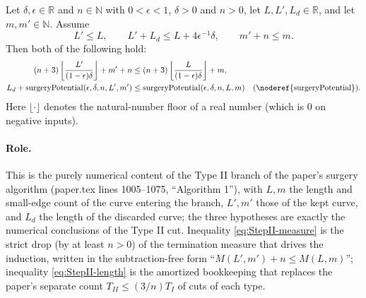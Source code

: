\begin{helper}
  Let $\delta,\epsilon \in \mathbb{R}$ and $n \in \mathbb{N}$ with $0<\epsilon<1$, $\delta>0$ and
  $n>0$, let $L,L',L_d \in \mathbb{R}$, and let $m,m' \in \mathbb{N}$. Assume
  \[
    L' \le L
    , \qquad
    L' + L_d \le L + 4\epsilon^{-1}\delta
    , \qquad
    m' + n \le m
    .
  \]
  Then both of the following hold:
  \begin{align}
    \label{eq:StepII-measure}
    (n+3)\left\lfloor \frac{L'}{(1-\epsilon)\delta} \right\rfloor + m' + n
      &\le (n+3)\left\lfloor \frac{L}{(1-\epsilon)\delta} \right\rfloor + m
    ,\\
    \label{eq:StepII-length}
    L_d + \mathrm{surgeryPotential}(\epsilon,\delta,n,L',m')
      &\le \mathrm{surgeryPotential}(\epsilon,\delta,n,L,m)
    \quad\text{(\noderef{surgeryPotential})}
    .
  \end{align}
  Here $\lfloor\cdot\rfloor$ denotes the natural-number floor of a real number (which is $0$ on
  negative inputs).

  \paragraph{Role.} This is the purely numerical content of the Type II branch of the paper's
  surgery algorithm (paper.tex lines 1005--1075, ``Algorithm 1''), with $L,m$ the length and
  small-edge count of the curve entering the branch, $L',m'$ those of the kept curve, and $L_d$ the
  length of the discarded curve; the three hypotheses are exactly the numerical conclusions of the
  Type II cut. Inequality \eqref{eq:StepII-measure} is the strict drop (by at least $n>0$) of the
  termination measure that drives the induction, written in the subtraction-free form
  ``$M(L',m')+n \le M(L,m)$''; inequality \eqref{eq:StepII-length} is the amortized bookkeeping
  that replaces the paper's separate count $T_{II}\le(3/n)T_I$ of cuts of each type.
\end{helper}
